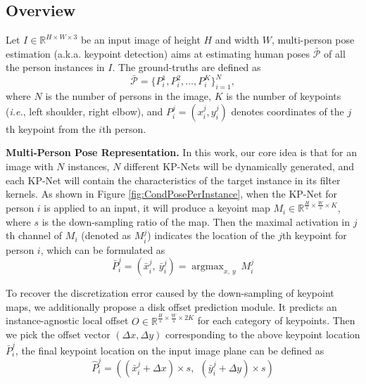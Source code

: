 \documentclass[sigconf]{acmart}
\begin{document}
\subsection{Overview}

Let
\begin{math}
  I \in \mathbb{R}^{H \times W \times 3}
\end{math}
be an input image of height $H$ and width $W$, multi-person pose estimation (a.k.a. keypoint detection) aims at estimating human poses $\mathcal{\bar{P}}$ of all the person instances in $I$. The ground-truths are defined as
\begin{equation}
  \mathcal{\bar{P}} = \{P_{i}^{1}, P_{i}^{2}, \ldots, {P_{i}^{K}\}_{i=1}^{N}},
\end{equation}
where $N$ is the number of persons in the image, $K$ is the number of keypoints (\textit{i.e.}, left shoulder, right elbow), and
\begin{math}
  P_{i}^{j} = (x_{i}^{j}, y_{i}^{j})
\end{math}
denotes coordinates of the $j$th keypoint from the $i$th person.

\textbf{Multi-Person Pose Representation.}\quad
In this work, our core idea is that for an image with $N$ instances, $N$ different KP-Nets will be dynamically generated, and each KP-Net will contain the characteristics of the target instance in its filter kernels.
As shown in Figure \ref{fig:CondPosePerInstance}, when the KP-Net for person $i$ is applied to an input, it will produce a keyoint map $M_{i} \in \mathbb{R}^{\frac{H}{s} \times \frac{W}{s} \times K}$, where $s$ is the down-sampling ratio of the map. Then the maximal activation in $j$th channel of ${M_{i}}$ (denoted as ${M_{i}^{j}}$) indicates the location of the $j$th keypoint for person $i$, which can be formulated as
\begin{equation}
  \label{equ:getmax}
  \bar{P}_{i}^{j} = \left( \bar{x}_{i}^{j}, \ \bar{y}_{i}^{j} \right) = \mathop{\arg\max}_{x,\ y} \ M_{i}^{j}
\end{equation}

To recover the discretization error caused by the down-sampling of keypoint maps, we additionally propose a disk offset prediction module. It predicts an instance-agnostic local offset $O \in \mathbb{R}^{\frac{H}{s} \times \frac{W}{s} \times 2K}$ for each category of keypoints. Then we pick the offset vector $(\Delta x, \Delta y)$ corresponding to the above keypoint location $\bar{P}_{i}^{j}$, the final keypoint location on the input image plane can be defined as
\begin{equation}
  \label{equ:offset-shifted}
  \hat{P}_{i}^{j} = \left( (\bar{x}_{i}^{j} + \Delta x) \times s, \  \ (\bar{y}_{i}^{j} + \Delta y)  \times s \right)
\end{equation}
\end{document}
